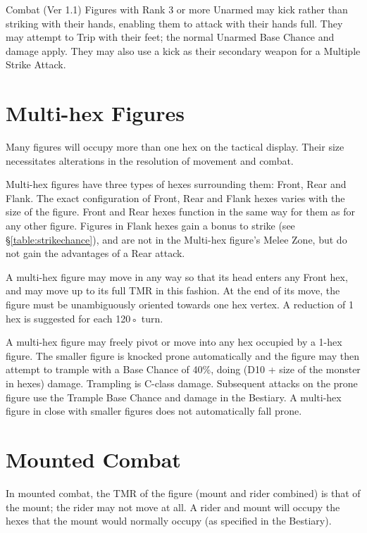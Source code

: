 \begin{Chapter}{Combat (Ver 1.1)}
Figures with Rank 3 or more Unarmed may kick rather than striking with
their hands, enabling them to attack with their hands full.  They may
attempt to Trip with their feet; the normal Unarmed Base Chance and
damage apply.  They may also use a kick as their secondary weapon for
a Multiple Strike Attack.

\section{Multi-hex Figures}
\label{combat:multihex}

Many figures will occupy more than one hex on the tactical display.
Their size necessitates alterations in the resolution of movement and
combat.

Multi-hex figures have three types of hexes surrounding them: Front,
Rear and Flank.  The exact configuration of Front, Rear and Flank
hexes varies with the size of the figure.  Front and Rear hexes
function in the same way for them as for any other figure.  Figures in
Flank hexes gain a bonus to strike (see \S\ref{table:strikechance}),
and are not in the Multi-hex figure’s Melee Zone, but do not gain the
advantages of a Rear attack.

A multi-hex figure may move in any way so that its head enters any
Front hex, and may move up to its full TMR in this fashion.  At the
end of its move, the figure must be unambiguously oriented towards one
hex vertex.  A reduction of 1 hex is suggested for each 120◦ turn.

A multi-hex figure may freely pivot or move into any hex occupied by a
1-hex figure.  The smaller figure is knocked prone automatically and
the figure may then attempt to trample with a Base Chance of 40\%,
doing (D10 + size of the monster in hexes) damage.  Trampling is
C-class damage.  Subsequent attacks on the prone figure use the
Trample Base Chance and damage in the Bestiary.  A multi-hex figure in
close with smaller figures does not automatically fall prone.

\section{Mounted Combat}
\label{combat:mounted}

In mounted combat, the TMR of the figure (mount and rider combined) is
that of the mount; the rider may not move at all.  A rider and mount
will occupy the hexes that the mount would normally occupy (as
specified in the Bestiary).


\end{Chapter}

